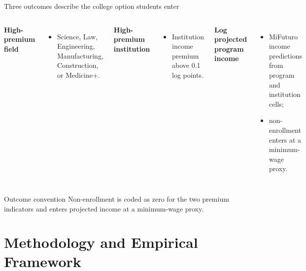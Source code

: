 \documentclass[11pt,aspectratio=169]{beamer}
\begin{document}
\begin{frame}{Three outcomes describe the college option students enter}
\begin{columns}[T,onlytextwidth]
  \textbf{High-premium field}
  \begin{itemize}
    \item Science, Law, Engineering, Manufacturing, Construction, or Medicine+.
  \end{itemize}

  \textbf{High-premium institution}
  \begin{itemize}
    \item Institution income premium above 0.1 log points.
  \end{itemize}

  \textbf{Log projected program income}
  \begin{itemize}
    \item MiFuturo income predictions from program and institution cells;
    \item non-enrollment enters at a minimum-wage proxy.
  \end{itemize}
\end{columns}

\vspace{0.25em}
\begin{alertblock}{Outcome convention}
Non-enrollment is coded as zero for the two premium indicators and enters projected income at a minimum-wage proxy.
\end{alertblock}
\end{frame}




\section{Methodology and Empirical Framework}
\end{document}
